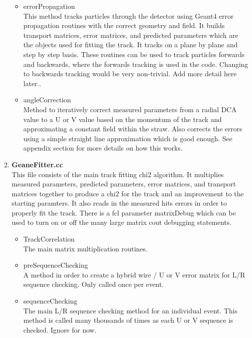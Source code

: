 \documentclass{article}
\begin{document}
\begin{enumerate}
\begin{itemize}
          \item{errorPropagation} \\ 
          This method tracks particles through the detector using Geant4 error propagation routines with the correct geometry and field. It builds transport matrices, error matrices, and predicted parameters which are the objects used for fitting the track. It tracks on a plane by plane and step by step basis. These routines can be used to track particles forwards and backwards, where the forwards tracking is used in the code. Changing to backwards tracking would be very non-trivial. Add more detail here later..

          \item{angleCorrection} \\
          Method to iteratively correct measured parameters from a radial DCA value to a U or V value based on the momentum of the track and approximating a constant field within the straw. Also corrects the errors using a simple straight line approximation which is good enough. See appendix section for more details on how this works.

        \end{itemize}

      \item{\bf{GeaneFitter.cc}} \\
      This file consists of the main track fitting chi2 algorithm. It multiplies measured parameters, predicted parameters, error matrices, and transport matrices together to produce a chi2 for the track and an improvement to the starting paramters. It also reads in the measured hits errors in order to properly fit the track. There is a fcl parameter matrixDebug which can be used to turn on or off the many large matrix cout debugging statements.

        \begin{itemize}

          \item{TrackCorrelation} \\
          The main matrix multiplication routines.

          \item{preSequenceChecking} \\
          A method in order to create a hybrid wire / U or V error matrix for L/R sequence checking. Only called once per event.

          \item{sequenceChecking} \\ 
          The main L/R sequence checking method for an individual event. This method is called many thousands of times as each U or V sequence is checked. Ignore for now.


\end{itemize}
\end{enumerate}
\end{document}
